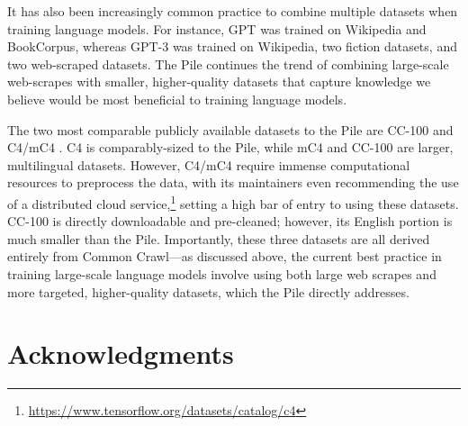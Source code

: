 \documentclass[11pt,a4paper]{article}
\begin{document}
It has also been increasingly common practice to combine multiple datasets when training language models. For instance, GPT \citep{GPT} was trained on Wikipedia and BookCorpus, whereas GPT-3 \citep{GPT3} was trained on Wikipedia, two fiction datasets, and two web-scraped datasets. The Pile continues the trend of combining large-scale web-scrapes with smaller, higher-quality datasets that capture knowledge we believe would be most beneficial to training language models.

The two most comparable publicly available datasets to the Pile are CC-100 \citep{wenzek2019ccnet} and C4/mC4 \citep{T5}. C4 is comparably-sized to the Pile, while mC4 and CC-100 are larger, multilingual datasets.
However, C4/mC4 require immense computational resources to preprocess the data, with its maintainers even recommending the use of a distributed cloud service,\footnote{\url{https://www.tensorflow.org/datasets/catalog/c4}} setting a high bar of entry to using these datasets. 
CC-100 is directly downloadable and pre-cleaned; however, its English portion is much smaller than the Pile.
Importantly, these three datasets are all derived entirely from Common Crawl---as discussed above, the current best practice in training large-scale language models involve using both large web scrapes and more targeted, higher-quality datasets, which the Pile directly addresses.

\section{Acknowledgments}
\end{document}
